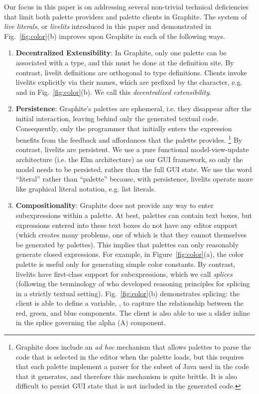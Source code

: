 Our focus in this paper is on addressing several non-trivial technical 
deficiencies that limit both palette providers and palette clients in Graphite. 
The system of \emph{live literals}, or \emph{livelits} introduced in
this paper and demonstrated in Fig.~\ref{fig:color}(b) improves upon Graphite  
in each of the following ways.
\begin{enumerate}
  \setlength\itemsep{0.5em}
  \item \textbf{Decentralized Extensibility}: 
    In Graphite, only one palette can be associated with a type, and this must
    be done at the definition site.
    By contrast, livelit definitions are orthogonal to type definitions. 
    Clients invoke livelits explicitly via their names, which are prefixed by the \li{\$} character, 
    e.g.  and  in Fig.~\ref{fig:color}(b).
    We call this \emph{decentralized extensibility}.
  \item \textbf{Persistence}: Graphite's palettes are {ephemeral}, 
  i.e. they disappear after the initial interaction, 
  leaving behind only the generated textual code.
  Consequently, only the programmer that initially enters the expression 
  benefits from the feedback and affordances that the palette provides.%
  \footnote{Graphite does include an \emph{ad hoc} mechanism that 
  allows palettes to parse the code that is selected in the editor 
  when the palette loads, but this requires that each palette implement 
  a parser for the subset of Java used in the code that it generates,
  and therefore this mechanism is quite brittle. It is also difficult 
  to persist GUI state that is not included in the generated code.}
  By contrast, livelits are persistent. We use a pure functional model-view-update architecture 
  (i.e. the Elm architecture) as our GUI framework, 
  so only the model needs to be persisted, rather than the full GUI state.  
  We use the word ``literal'' rather than ``palette'' because, with persistence, livelits
  operate more like graphical literal notation, e.g. list literals.

  \item \textbf{Compositionality}: 
  Graphite does not provide any way to {enter subexpressions within a palette}.
  At best, palettes can contain text boxes, but expressions entered into these text boxes 
  do not have any editor support (which creates many problems, one of which is that they cannot themselves be generated by palettes). 
  This implies that palettes can only reasonably generate {closed expressions}. 
  For example, in Figure~\ref{fig:color}(a), the color palette
  is useful only for generating simple color constants. 
  By contrast, livelits have first-class support for subexpressions, which we call \emph{splices} (following
  the terminology of \citet{TLMs} who developed reasoning principles for splicing in a strictly textual setting).
  Fig.~\ref{fig:color}(b) demonstrates splicing: the client is able to define a variable, , 
  to capture the relationship between the red, green, and blue components.
  The client is also able to use a slider inline in the splice governing 
  the alpha (A) component.


\end{enumerate}
